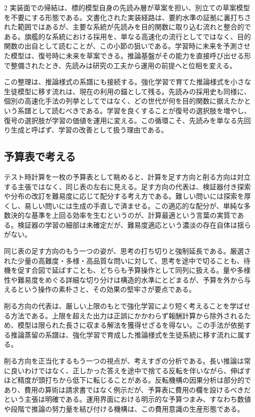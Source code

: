 \documentclass[lualatex,a4paper,10pt]{jlreq}
\begin{document}
\begin{multicols}{2}
実装面での帰結は、標的模型自身の先読み層が草案を担い、別立ての草案模型を不要にする形態である。文書化された実装経路は、要約水準の証拠に裏打ちされた範囲ではあるが、主要な系統が先読みを目的関数に取り込む流れと整合的である\autocite{vllmmtp}。旗艦的な系統における採用を、単なる高速化の流行としてではなく、目的関数の出自として読むことが、この小節の狙いである。学習時に未来を予測させた模型は、復号時に未来を草案できる。推論基盤がその能力を直接呼び出せる形で整備されたとき、先読みは研究の工夫から運用の前提へと位相を変える。

この整理は、推論様式の系譜にも接続する。強化学習で育てた推論様式を小さな生徒模型に移す流れは、現在の利用の錨として残る\autocite{r1}。先読みの採用史も同様に、個別の高速化手法の列挙としてではなく、どの世代が何を目的関数に据えたかという系譜として読むべきである。学習を良くすることが復号の選択肢を増やし、復号の選択肢が学習の価値を運用に変える。この循環こそ、先読みを単なる先回り生成と呼ばず、学習の改善として扱う理由である。

\subsection{予算表で考える}
テスト時計算を一枚の予算表として眺めると、計算を足す方向と削る方向は対立する主張ではなく、同じ表の左右に見える。足す方向の代表は、検証器付き探索や分布の改訂を難易度に応じて配分する考え方である。難しい問いには探索を厚くし、易しい問いには生成の手直しで済ませる。この適応的な配分が、単純な多数決的な基準を上回る効率を生むというのが、計算最適という言葉の実質である\autocite{snell2024}。検証器の学習の細部は未確定だが、難易度適応という濃淡の存在自体は揺らがない。

同じ表の足す方向のもう一つの姿が、思考の打ち切りと強制延長である。厳選された少量の高難度・多様・高品質な問いに対して、思考を途中で切ることも、待機を促す合図で延ばすことも、どちらも予算操作として同列に扱える。量や多様性や難易度をめぐる詳細な切り分けは構造的水準にとどまるが、予算を外から与えるという操作の素朴さと、その効果の堅牢さが要点である\autocite{s1}。

削る方向の代表は、厳しい上限のもとで強化学習により短く考えることを学ばせる方法である\autocite{thinkprune}。上限を超えた出力は正誤にかかわらず報酬計算から除外されるため、模型は限られた長さに収まる解法を獲得せざるを得ない。この手法が依拠する推論蒸留の系譜は、強化学習で育成した推論様式を生徒系統に移す流れに属する\autocite{r1}。

削る方向を正当化するもう一つの視点が、考えすぎの分析である。長い推論は常に良いわけではなく、正しかった答えを途中で捨てる反転を伴いながら、伸ばすほど精度が頭打ちから低下に転じることがある\autocite{overthink}。反転機構の因果分析は部分的であり、費用の算術は請求書ではなく例示だが、予算表に費用の欄を設けるべきだという主張は明確である。運用界面における明示的な予算つまみ、すなわち数値や段階で推論の努力量を結び付ける機構は、この費用意識の生産形態である\autocite{effortbind}。


\end{multicols}
\end{document}
